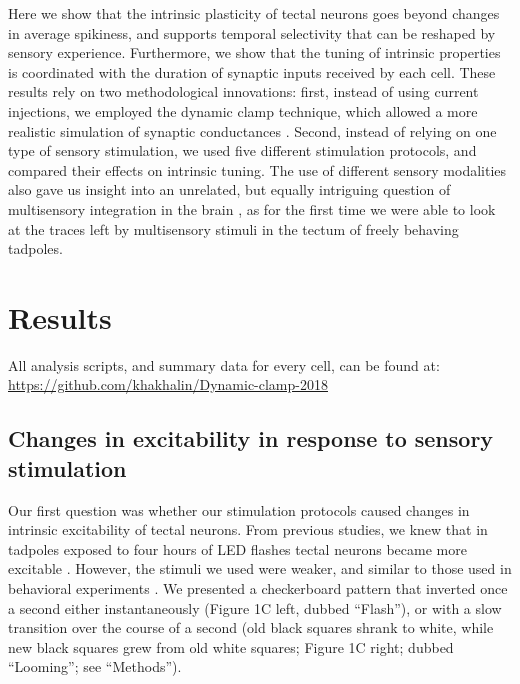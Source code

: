 \documentclass{article}
\begin{document}
Here we show that the intrinsic plasticity of tectal neurons goes beyond changes in average spikiness, and supports temporal selectivity that can be reshaped by sensory experience. Furthermore, we show that the tuning of intrinsic properties is coordinated with the duration of synaptic inputs received by each cell. These results rely on two methodological innovations: first, instead of using current injections, we employed the dynamic clamp technique, which allowed a more realistic simulation of synaptic conductances \citep{prinz2004}. Second, instead of relying on one type of sensory stimulation, we used five different stimulation protocols, and compared their effects on intrinsic tuning. The use of different sensory modalities also gave us insight into an unrelated, but equally intriguing question of multisensory integration in the brain \citep{deeg2009,felch2016,truszkowski2017}, as for the first time we were able to look at the traces left by multisensory stimuli in the tectum of freely behaving tadpoles.



\section*{Results}

All analysis scripts, and summary data for every cell, can be found at:  \url{https://github.com/khakhalin/Dynamic-clamp-2018}

\subsection*{Changes in excitability in response to sensory stimulation}

Our first question was whether our stimulation protocols caused changes in intrinsic excitability of tectal neurons. From previous studies, we knew that in tadpoles exposed to four hours of LED flashes tectal neurons became more excitable \citep{aizenman2003,ciarleglio2015}. However, the stimuli we used were weaker, and similar to those used in behavioral experiments \citep{khakhalin2014,james2015,truszkowski2017}. We presented a checkerboard pattern that inverted once a second either instantaneously (Figure 1C left, dubbed “Flash”), or with a slow transition over the course of a second (old black squares shrank to white, while new black squares grew from old white squares; Figure 1C right; dubbed “Looming”; see “Methods”).
\end{document}

